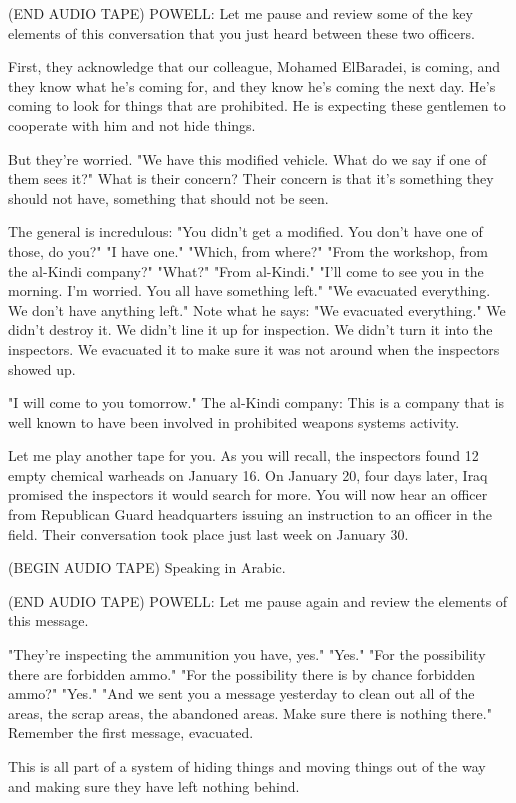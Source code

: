 \documentclass[10pt,a4paper]{article}
\begin{document}
(END AUDIO TAPE) POWELL: Let me pause and review some of the key elements of this conversation that you just heard between these two officers.

First, they acknowledge that our colleague, Mohamed ElBaradei, is coming, and they know what he's coming for, and they know he's coming the next day. He's coming to look for things that are prohibited. He is expecting these gentlemen to cooperate with him and not hide things.

But they're worried. "We have this modified vehicle. What do we say if one of them sees it?" What is their concern? Their concern is that it's something they should not have, something that should not be seen.

The general is incredulous: "You didn't get a modified. You don't have one of those, do you?" "I have one." "Which, from where?" "From the workshop, from the al-Kindi company?" "What?" "From al-Kindi." "I'll come to see you in the morning. I'm worried. You all have something left." "We evacuated everything. We don't have anything left." Note what he says: "We evacuated everything." We didn't destroy it. We didn't line it up for inspection. We didn't turn it into the inspectors. We evacuated it to make sure it was not around when the inspectors showed up.

"I will come to you tomorrow." The al-Kindi company: This is a company that is well known to have been involved in prohibited weapons systems activity.

Let me play another tape for you. As you will recall, the inspectors found 12 empty chemical warheads on January 16. On January 20, four days later, Iraq promised the inspectors it would search for more. You will now hear an officer from Republican Guard headquarters issuing an instruction to an officer in the field. Their conversation took place just last week on January 30.

(BEGIN AUDIO TAPE) Speaking in Arabic.

(END AUDIO TAPE) POWELL: Let me pause again and review the elements of this message.

"They're inspecting the ammunition you have, yes." "Yes." "For the possibility there are forbidden ammo." "For the possibility there is by chance forbidden ammo?" "Yes." "And we sent you a message yesterday to clean out all of the areas, the scrap areas, the abandoned areas. Make sure there is nothing there." Remember the first message, evacuated.

This is all part of a system of hiding things and moving things out of the way and making sure they have left nothing behind.
\end{document}
